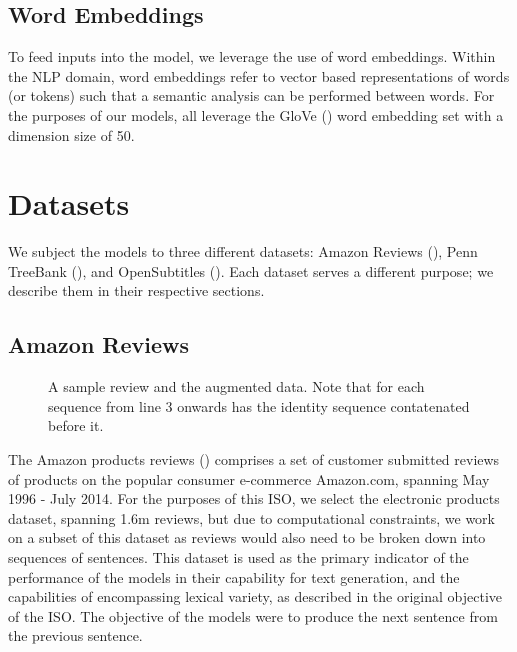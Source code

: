 \documentclass[12pt,twoside]{report}
\begin{document}
\subsection*{Word Embeddings}
\label{word_embeddings}

To feed inputs into the model, we leverage the use of word embeddings. Within the NLP domain, word embeddings refer to vector based representations of words (or tokens) such that a semantic analysis can be performed between words. For the purposes of our models, all leverage the GloVe (\cite{pennington_glove:_2014}) word embedding set with a dimension size of 50.

\section{Datasets}

We subject the models to three different datasets: Amazon Reviews (\cite{he_ups_2016}), Penn TreeBank (\cite{marcus_building_2002}), and OpenSubtitles (\cite{lison_opensubtitles2016:_2016}). Each dataset serves a different purpose; we describe them in their respective sections.

\subsection{Amazon Reviews}

\begin{figure}[!ht]
	\centering
	
	
	\caption{A sample review and the augmented data. Note that for each sequence from line 3 onwards has the identity sequence contatenated before it. \label{ex_dataset:amazon}}
\end{figure}

The Amazon products reviews (\cite{he_ups_2016}) comprises a set of customer submitted reviews of products on the popular consumer e-commerce Amazon.com, spanning May 1996 - July 2014. For the purposes of this ISO, we select the electronic products dataset, spanning 1.6m reviews, but due to computational constraints, we work on a subset of this dataset as reviews would also need to be broken down into sequences of sentences. This dataset is used as the primary indicator of the performance of the models in their capability for text generation, and the capabilities of encompassing lexical variety, as described in the original objective of the ISO. The objective of the models were to produce the next sentence from the previous sentence. 
\end{document}
